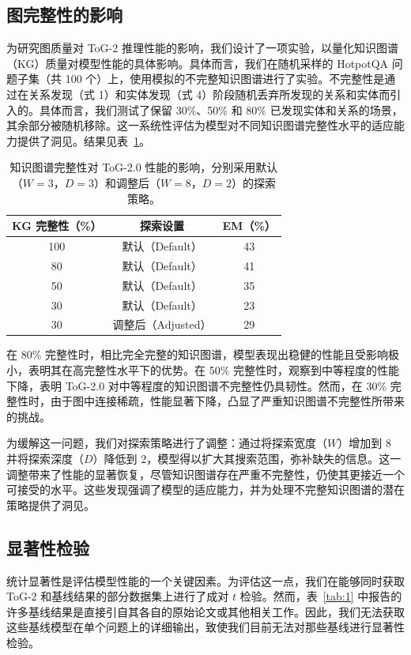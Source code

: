 \documentclass[11pt,UTF8,fontset=fandol]{ctexart}
\newcommand{\toctwo}{ToG-2}
\begin{document}
\subsection{图完整性的影响}

为研究图质量对 \toctwo{} 推理性能的影响，我们设计了一项实验，以量化知识图谱（KG）质量对模型性能的具体影响。具体而言，我们在随机采样的 HotpotQA 问题子集（共 100 个）上，使用模拟的不完整知识图谱进行了实验。不完整性是通过在关系发现（式 1）和实体发现（式 4）阶段随机丢弃所发现的关系和实体而引入的。具体而言，我们测试了保留 30\%、50\% 和 80\% 已发现实体和关系的场景，其余部分被随机移除。这一系统性评估为模型对不同知识图谱完整性水平的适应能力提供了洞见。结果见表~\ref{tab:11}。

\begin{table}[H]\centering
\caption{知识图谱完整性对 \toctwo{}.0 性能的影响，分别采用默认（$W=3$，$D=3$）和调整后（$W=8$，$D=2$）的探索策略。}
\begin{tabular}{ccc}
\toprule
KG 完整性（\%） & 探索设置 & EM（\%）\\
\midrule
100 & 默认（Default） & 43\\
80 & 默认（Default） & 41\\
50 & 默认（Default） & 35\\
30 & 默认（Default） & 23\\
30 & 调整后（Adjusted） & 29\\
\bottomrule
\end{tabular}
\label{tab:11}
\end{table}

在 80\% 完整性时，相比完全完整的知识图谱，模型表现出稳健的性能且受影响极小，表明其在高完整性水平下的优势。在 50\% 完整性时，观察到中等程度的性能下降，表明 \toctwo{}.0 对中等程度的知识图谱不完整性仍具韧性。然而，在 30\% 完整性时，由于图中连接稀疏，性能显著下降，凸显了严重知识图谱不完整性所带来的挑战。

为缓解这一问题，我们对探索策略进行了调整：通过将探索宽度（$W$）增加到 8 并将探索深度（$D$）降低到 2，模型得以扩大其搜索范围，弥补缺失的信息。这一调整带来了性能的显著恢复，尽管知识图谱存在严重不完整性，仍使其更接近一个可接受的水平。这些发现强调了模型的适应能力，并为处理不完整知识图谱的潜在策略提供了洞见。

\subsection{显著性检验}

统计显著性是评估模型性能的一个关键因素。为评估这一点，我们在能够同时获取 \toctwo{} 和基线结果的部分数据集上进行了成对 $t$ 检验。然而，表~\ref{tab:1} 中报告的许多基线结果是直接引自其各自的原始论文或其他相关工作。因此，我们无法获取这些基线模型在单个问题上的详细输出，致使我们目前无法对那些基线进行显著性检验。
\end{document}
